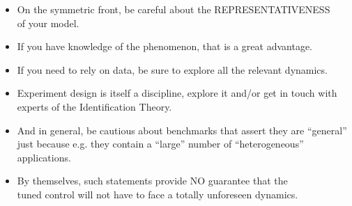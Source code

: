 \begin{frame}
\myPause
 \begin{itemize}[<+-| alert@+>]
 \item On the symmetric front, be careful about the REPRESENTATIVENESS\\
       of your model.
 \item If you have knowledge of the phenomenon, that is a great advantage.
 \item If you need to rely on data, be sure to explore all the relevant dynamics.
 \item Experiment design is itself a discipline, explore it and/or get in touch with\\
       experts of the Identification Theory.
 \item And in general, be cautious about benchmarks that assert they are ``general''\\
       just because e.g. they contain a ``large'' number of ``heterogeneous''\\
       applications.
 \item By themselves, such statements provide NO guarantee that the\\
       tuned control will not have to face a totally unforeseen dynamics.
 \end{itemize}
\end{frame}

